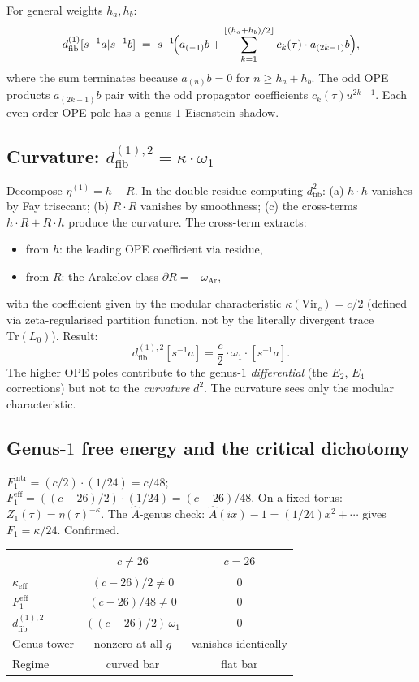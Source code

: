 \documentclass[11pt]{article}
\newcommand{\dfib}{d_{\mathrm{fib}}}
\begin{document}
For general weights $h_a, h_b$:
\[
\dfib^{(1)}[s^{-1}a|s^{-1}b]
\;=\;
s^{-1}\!\Bigl(
  a_{(-1)}b
  + \sum_{k=1}^{\lfloor(h_a+h_b)/2\rfloor}
    c_k(\tau)\cdot a_{(2k-1)}b
\Bigr),
\]
where the sum terminates because $a_{(n)}b = 0$ for
$n \ge h_a + h_b$.  The odd OPE products $a_{(2k-1)}b$
pair with the odd propagator coefficients $c_k(\tau)u^{2k-1}$.
Each even-order OPE pole has a genus-$1$ Eisenstein shadow.

\subsection*{Curvature: $\dfib^{(1),2} = \kappa\cdot\omega_1$}

Decompose $\eta^{(1)} = h + R$.  In the double residue computing
$\dfib^2$: (a) $h\cdot h$ vanishes by Fay trisecant; (b) $R\cdot R$
vanishes by smoothness; (c) the cross-terms $h\cdot R + R\cdot h$
produce the curvature.  The cross-term extracts:
\begin{itemize}
\item from $h$: the leading OPE coefficient via residue,
\item from $R$: the Arakelov class $\bar\partial R
  = -\omega_{\mathrm{Ar}}$,
\end{itemize}
with the coefficient given by the modular characteristic
$\kappa(\mathrm{Vir}_c) = c/2$
(defined via zeta-regularised partition function, not by the
literally divergent trace $\mathrm{Tr}(L_0)$).  Result:
\[
\dfib^{(1),2}[s^{-1}a]
= \frac{c}{2}\cdot\omega_1\cdot [s^{-1}a].
\]
The higher OPE poles contribute to the genus-$1$ \emph{differential}
(the $E_2$, $E_4$ corrections) but not to the \emph{curvature}
$d^2$.  The curvature sees only the modular characteristic.

\subsection*{Genus-$1$ free energy and the critical dichotomy}

$F_1^{\mathrm{intr}} = (c/2)\cdot(1/24) = c/48$;
$F_1^{\mathrm{eff}} = ((c{-}26)/2)\cdot(1/24) = (c{-}26)/48$.
On a fixed torus: $Z_1(\tau) = \eta(\tau)^{-\kappa}$.  The
$\hat{A}$-genus check:
$\hat{A}(ix) - 1 = (1/24)x^2 + \cdots$ gives
$F_1 = \kappa/24$.  Confirmed.

\medskip
\begin{center}
\renewcommand{\arraystretch}{1.15}
\begin{tabular}{@{}lcc@{}}
& $c \neq 26$ & $c = 26$ \\
\hline
$\kappa_{\mathrm{eff}}$ & $(c{-}26)/2 \neq 0$ & $0$ \\
$F_1^{\mathrm{eff}}$ & $(c{-}26)/48 \neq 0$ & $0$ \\
$\dfib^{(1),2}$ & $((c{-}26)/2)\,\omega_1$ & $0$ \\
Genus tower & nonzero at all $g$ & vanishes identically \\
Regime & curved bar & flat bar
\end{tabular}
\end{center}
\end{document}
